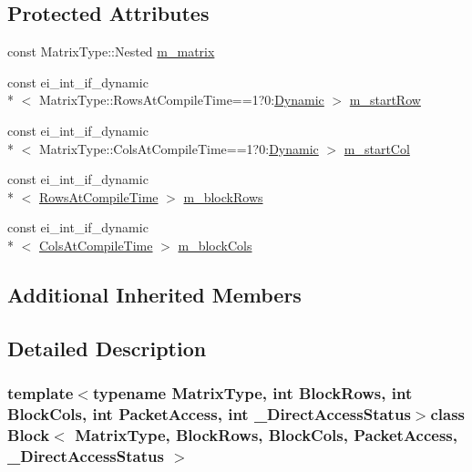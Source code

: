 \subsection*{Protected Attributes}
\begin{DoxyCompactItemize}
\item 
const Matrix\-Type\-::\-Nested \hyperlink{class_block_ac527318db350afd3af368ba80b1ba3eb}{m\-\_\-matrix}
\item 
const ei\-\_\-int\-\_\-if\-\_\-dynamic\\*
$<$ Matrix\-Type\-::\-Rows\-At\-Compile\-Time==1?0\-:\hyperlink{_constants_8h_adc9da5be31bdce40c25a92c27999c0e3}{Dynamic} $>$ \hyperlink{class_block_a4ecc465fc0b668b4e26c4d946a3b2c8b}{m\-\_\-start\-Row}
\item 
const ei\-\_\-int\-\_\-if\-\_\-dynamic\\*
$<$ Matrix\-Type\-::\-Cols\-At\-Compile\-Time==1?0\-:\hyperlink{_constants_8h_adc9da5be31bdce40c25a92c27999c0e3}{Dynamic} $>$ \hyperlink{class_block_a272790377a35387e424f99323fd226f4}{m\-\_\-start\-Col}
\item 
const ei\-\_\-int\-\_\-if\-\_\-dynamic\\*
$<$ \hyperlink{class_matrix_base_aaa53a8ec1bc1ba52b1e50631dac15d6da10c48c1361376cbd5ef62a18966f2691}{Rows\-At\-Compile\-Time} $>$ \hyperlink{class_block_a7a337b29f56a0984c9f8a190092e6942}{m\-\_\-block\-Rows}
\item 
const ei\-\_\-int\-\_\-if\-\_\-dynamic\\*
$<$ \hyperlink{class_matrix_base_aaa53a8ec1bc1ba52b1e50631dac15d6da359babfd1277ae780433d99b383e00e8}{Cols\-At\-Compile\-Time} $>$ \hyperlink{class_block_ac098f4da0b6a27c85908361eb7cdb256}{m\-\_\-block\-Cols}
\end{DoxyCompactItemize}
\subsection*{Additional Inherited Members}


\subsection{Detailed Description}
\subsubsection*{template$<$typename Matrix\-Type, int Block\-Rows, int Block\-Cols, int Packet\-Access, int \-\_\-\-Direct\-Access\-Status$>$class Block$<$ Matrix\-Type, Block\-Rows, Block\-Cols, Packet\-Access, \-\_\-\-Direct\-Access\-Status $>$}


